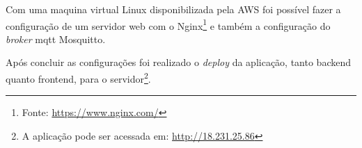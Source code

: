 Com uma maquina virtual Linux disponibilizada pela AWS foi possível fazer a configuração de um servidor web com o Nginx\footnote{Fonte: \url{https://www.nginx.com/}}
e também a configuração do \textit{broker} mqtt Mosquitto.

Após concluir as configurações foi realizado o \textit{deploy} da aplicação, tanto backend quanto frontend, para o servidor\footnote{A aplicação pode ser acessada em: \url{http://18.231.25.86}}.